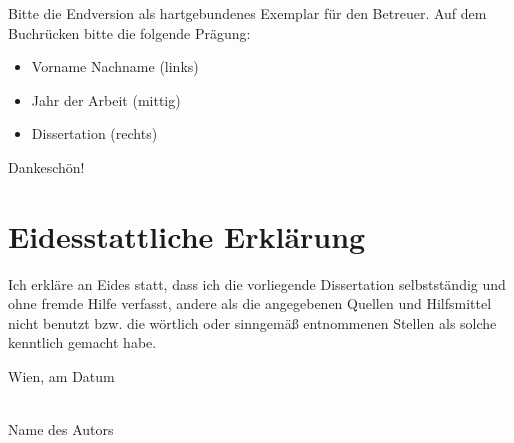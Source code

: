 \documentclass[a4paper,11pt,bibliography=totoc,listof=totoc,headinclude=true,cleardoublepage=empty,oneside]{NumPDEsThesis}
\begin{document}
\vfill

Bitte die Endversion als hartgebundenes Exemplar für den Betreuer. Auf dem Buchrücken bitte die folgende Prägung:
\begin{itemize}
\item Vorname Nachname (links)
\item Jahr der Arbeit (mittig)
\item Dissertation (rechts)
\end{itemize}
Dankeschön!

\cleardoublepage


\chapter*{Eidesstattliche Erkl\"arung}
\thispagestyle{empty}

\vspace*{2cm}

Ich erkl\"are an Eides statt, dass ich die vorliegende Dissertation selbstst\"andig und ohne fremde Hilfe verfasst, andere als die angegebenen Quellen und Hilfsmittel nicht benutzt bzw. die w\"ortlich oder sinngem\"a{\ss} entnommenen Stellen als solche kenntlich gemacht habe.

\vspace*{3cm}

\noindent
Wien, am {\color{change}Datum} %
%
\hfill 
%
\begin{minipage}[t]{5cm}
\centering
\underline{\hspace*{5cm}}\\
\small\color{change}Name des Autors
\end{minipage}

\cleardoublepage



\tableofcontents

\cleardoublepage
{} 
\end{document}
